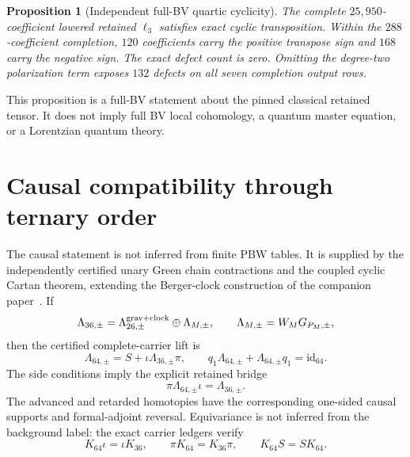 \documentclass[11pt]{article}
\newtheorem{proposition}[theorem]{Proposition}
\theoremstyle{definition}
\theoremstyle{remark}
\newcommand{\id}{\mathrm{id}}
\begin{document}
\begin{proposition}[Independent full-BV quartic cyclicity]
\label{prop:full-bv-cyclicity}
The complete $25{,}950$-coefficient lowered retained $\ell_3$ satisfies exact
cyclic transposition.  Within the $288$-coefficient completion, $120$
coefficients carry the positive transpose sign and $168$ carry the negative
sign.  The exact defect count is zero.  Omitting the degree-two polarization
term exposes $132$ defects on all seven completion output rows.
\end{proposition}

This proposition is a full-BV statement about the pinned classical retained
tensor.  It does not imply full BV local cohomology, a quantum master equation,
or a Lorentzian quantum theory.

\section{Causal compatibility through ternary order}\label{sec:causal}

The causal statement is not inferred from finite PBW tables.  It is supplied
by the independently certified unary Green chain contractions and the coupled
cyclic Cartan theorem, extending the Berger-clock construction of the
companion paper~\cite{BergerClockPaper}.  If
\begin{equation}
 \Lambda_{36,\pm}=\Lambda_{26,\pm}^{\rm grav+clock}
                    \oplus\Lambda_{M,\pm},
 \qquad
 \Lambda_{M,\pm}=W_MG_{P_M,\pm},
\end{equation}
then the certified complete-carrier lift is
\begin{equation}\label{eq:causal-lift}
 \Lambda_{64,\pm}=S+\iota\Lambda_{36,\pm}\pi,
 \qquad
 q_1\Lambda_{64,\pm}+\Lambda_{64,\pm}q_1=\id_{64}.
\end{equation}
The side conditions imply the explicit retained bridge
\begin{equation}\label{eq:causal-descend}
 \pi\Lambda_{64,\pm}\iota=\Lambda_{36,\pm}.
\end{equation}
The advanced and retarded homotopies have the corresponding one-sided causal
supports and formal-adjoint reversal.  Equivariance is not inferred from the
background label: the exact carrier ledgers verify
\begin{equation}\label{eq:K-equivariance}
 K_{64}\iota=\iota K_{36},\qquad
 \pi K_{64}=K_{36}\pi,\qquad
 K_{64}S=SK_{64}.
\end{equation}
\end{document}
